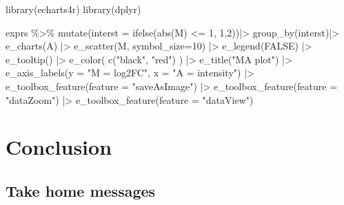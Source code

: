 \documentclass[
]{book}
\newenvironment{Shaded}{\begin{snugshade}}{\end{snugshade}}
\newcommand{\AttributeTok}[1]{\textcolor[rgb]{0.77,0.63,0.00}{#1}}
\newcommand{\ConstantTok}[1]{\textcolor[rgb]{0.00,0.00,0.00}{#1}}
\newcommand{\DecValTok}[1]{\textcolor[rgb]{0.00,0.00,0.81}{#1}}
\newcommand{\FunctionTok}[1]{\textcolor[rgb]{0.00,0.00,0.00}{#1}}
\newcommand{\NormalTok}[1]{#1}
\newcommand{\SpecialCharTok}[1]{\textcolor[rgb]{0.00,0.00,0.00}{#1}}
\newcommand{\StringTok}[1]{\textcolor[rgb]{0.31,0.60,0.02}{#1}}
\begin{document}
\begin{Shaded}
\begin{Highlighting}[]
\FunctionTok{library}\NormalTok{(echarts4r)}
\FunctionTok{library}\NormalTok{(dplyr)}

\NormalTok{exprs  }\SpecialCharTok{\%\textgreater{}\%}
  \FunctionTok{mutate}\NormalTok{(}\AttributeTok{interst =} \FunctionTok{ifelse}\NormalTok{(}\FunctionTok{abs}\NormalTok{(M) }\SpecialCharTok{\textless{}=} \DecValTok{1}\NormalTok{, }\DecValTok{1}\NormalTok{,}\DecValTok{2}\NormalTok{))}\SpecialCharTok{|\textgreater{}} 
  \FunctionTok{group\_by}\NormalTok{(interst)}\SpecialCharTok{|\textgreater{}}          
  \FunctionTok{e\_charts}\NormalTok{(A) }\SpecialCharTok{|\textgreater{}} 
  \FunctionTok{e\_scatter}\NormalTok{(M, }\AttributeTok{symbol\_size=}\DecValTok{10}\NormalTok{) }\SpecialCharTok{|\textgreater{}} 
  \FunctionTok{e\_legend}\NormalTok{(}\ConstantTok{FALSE}\NormalTok{) }\SpecialCharTok{|\textgreater{}}
  \FunctionTok{e\_tooltip}\NormalTok{() }\SpecialCharTok{|\textgreater{}}
  \FunctionTok{e\_color}\NormalTok{(}
    \FunctionTok{c}\NormalTok{(}\StringTok{"black"}\NormalTok{, }\StringTok{"red"}\NormalTok{)}
\NormalTok{  ) }\SpecialCharTok{|\textgreater{}}
  \FunctionTok{e\_title}\NormalTok{(}\StringTok{"MA plot"}\NormalTok{) }\SpecialCharTok{|\textgreater{}}
  \FunctionTok{e\_axis\_labels}\NormalTok{(}\AttributeTok{y =} \StringTok{"M = log2FC"}\NormalTok{, }\AttributeTok{x =} \StringTok{"A = intensity"}\NormalTok{) }\SpecialCharTok{|\textgreater{}}
  \FunctionTok{e\_toolbox\_feature}\NormalTok{(}\AttributeTok{feature =} \StringTok{"saveAsImage"}\NormalTok{)  }\SpecialCharTok{|\textgreater{}}
  \FunctionTok{e\_toolbox\_feature}\NormalTok{(}\AttributeTok{feature =} \StringTok{"dataZoom"}\NormalTok{)  }\SpecialCharTok{|\textgreater{}}
  \FunctionTok{e\_toolbox\_feature}\NormalTok{(}\AttributeTok{feature =} \StringTok{"dataView"}\NormalTok{)}
\end{Highlighting}
\end{Shaded}

\hypertarget{conclusion}{%
\chapter{Conclusion}\label{conclusion}}

\hypertarget{take-home-messages}{%
\section{Take home messages}\label{take-home-messages}}
\end{document}
